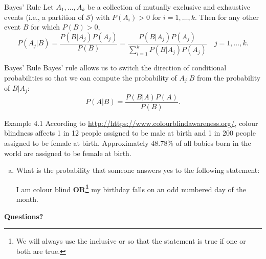 \documentclass[aspectratio=169,xcolor=pdftex,dvipsnames,table]{beamer}\usepackage[]{graphicx}\usepackage[]{xcolor}
\begin{document}
\begin{frame}{Bayes' Rule}
  Let $A_1,\ldots,A_k$ be a collection of mutually exclusive and exhaustive events (i.e., a partition of $\mathcal S$) with $P(A_i)>0$ for $i=1,\ldots,k$. Then for any other event $B$ for which $P(B)>0$,
  \[
    P(A_j|B)=\frac{P(B|A_j)P(A_j)}{P(B)}=\frac{P(B|A_j)P(A_j)}{\sum_{i=1}^kP(B|A_j)P(A_j)} \quad j=1,\ldots,k.
  \]
\end{frame}

\begin{frame}{Bayes' Rule}
  Bayes' rule allows us to switch the direction of conditional probabilities so that we can compute the probability of $A_j|B$ from the probability of $B|A_j$:
  \[
    P(A|B)=\frac{P(B|A)P(A)}{P(B)}.
  \]

\end{frame}

\begin{frame}
  \begin{block}{Example 4.1}
    According to \url{http://https://www.colourblindawareness.org/}, colour blindness affects 1 in 12 people assigned to be male at birth and 1 in 200 people assigned to be female at birth. Approximately 48.78\% of all babies born in the world are assigned to be female at birth.

    \begin{enumerate}[e)]
      
    \item What is the probability that someone answers yes to the following statement:\\
      \begin{center}
        I am colour blind \textbf{OR\footnote{We will always use the inclusive or so that the statement is true if one or both are true.}} my birthday falls on an odd numbered day of the month. 
      \end{center}
      
    \end{enumerate}
  \end{block}
\end{frame}

\begin{frame}
  \begin{center}
    \Large{\textbf{Questions?}}
  \end{center}
\end{frame}
\end{document}
